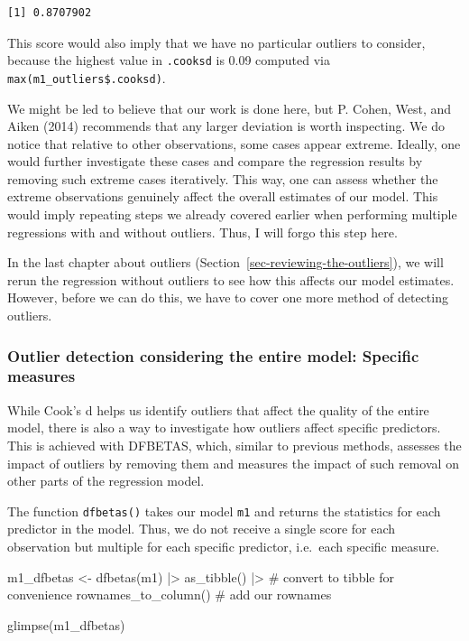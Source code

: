 \documentclass[
  letterpaper,
]{krantz}
\makeatletter
\newenvironment{Shaded}{\begin{snugshade}}{\end{snugshade}}
\newcommand{\CommentTok}[1]{\textcolor[rgb]{0.37,0.37,0.37}{#1}}
\newcommand{\FunctionTok}[1]{\textcolor[rgb]{0.28,0.35,0.67}{#1}}
\newcommand{\NormalTok}[1]{\textcolor[rgb]{0.00,0.23,0.31}{#1}}
\newcommand{\OtherTok}[1]{\textcolor[rgb]{0.00,0.23,0.31}{#1}}
\newcommand{\SpecialCharTok}[1]{\textcolor[rgb]{0.37,0.37,0.37}{#1}}
\newenvironment{kframe}{%
\medskip{}
\setlength{\fboxsep}{.8em}
 \def\at@end@of@kframe{}%
 \ifinner\ifhmode%
  \def\at@end@of@kframe{\end{minipage}}%
  \begin{minipage}{\columnwidth}%
 \fi\fi%
 \def\FrameCommand##1{\hskip\@totalleftmargin \hskip-\fboxsep
 \colorbox{shadecolor}{##1}\hskip-\fboxsep
     \hskip-\linewidth \hskip-\@totalleftmargin \hskip\columnwidth}%
 \MakeFramed {\advance\hsize-\width
   \@totalleftmargin\z@ \linewidth\hsize
   \@setminipage}}%
 {\par\unskip\endMakeFramed%
 \at@end@of@kframe}
\renewenvironment{Shaded}{\begin{kframe}}{\end{kframe}}
\makeatother
\begin{document}
\begin{verbatim}
[1] 0.8707902
\end{verbatim}

This score would also imply that we have no particular outliers to
consider, because the highest value in \texttt{.cooksd} is 0.09 computed
via \texttt{max(m1\_outliers\$.cooksd)}.

We might be led to believe that our work is done here, but P. Cohen,
West, and Aiken (2014) recommends that any larger deviation is worth
inspecting. We do notice that relative to other observations, some cases
appear extreme. Ideally, one would further investigate these cases and
compare the regression results by removing such extreme cases
iteratively. This way, one can assess whether the extreme observations
genuinely affect the overall estimates of our model. This would imply
repeating steps we already covered earlier when performing multiple
regressions with and without outliers. Thus, I will forgo this step
here.

In the last chapter about outliers
(Section~\ref{sec-reviewing-the-outliers}), we will rerun the regression
without outliers to see how this affects our model estimates. However,
before we can do this, we have to cover one more method of detecting
outliers.

\subsubsection{Outlier detection considering the entire model: Specific
measures}\label{sec-outlier-detection-specific-measures}

While Cook's d helps us identify outliers that affect the quality of the
entire model, there is also a way to investigate how outliers affect
specific predictors. This is achieved with DFBETAS, which, similar to
previous methods, assesses the impact of outliers by removing them and
measures the impact of such removal on other parts of the regression
model.

The function \texttt{dfbetas()} takes our model \texttt{m1} and returns
the statistics for each predictor in the model. Thus, we do not receive
a single score for each observation but multiple for each specific
predictor, i.e.~each specific measure.

\begin{Shaded}
\begin{Highlighting}[]
\NormalTok{m1\_dfbetas }\OtherTok{\textless{}{-}}
  \FunctionTok{dfbetas}\NormalTok{(m1) }\SpecialCharTok{|\textgreater{}}
  \FunctionTok{as\_tibble}\NormalTok{() }\SpecialCharTok{|\textgreater{}}               \CommentTok{\# convert to tibble for convenience}
  \FunctionTok{rownames\_to\_column}\NormalTok{()          }\CommentTok{\# add our rownames}

\FunctionTok{glimpse}\NormalTok{(m1\_dfbetas)}
\end{Highlighting}
\end{Shaded}
\end{document}
